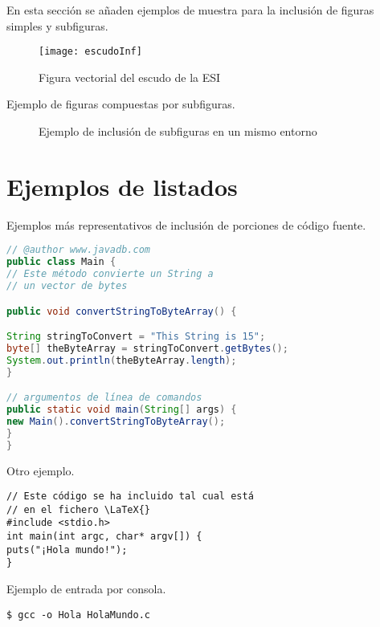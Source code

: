En esta sección se añaden ejemplos de muestra para la inclusión de figuras simples y subfiguras.

\begin{figure}[htb]
	\centering
	\texttt{[image: escudoInf]}
	\caption[Ejemplo de figura]{Figura vectorial del escudo de la ESI}
	\label{fig:ejFigure}
\end{figure}


\noindent Ejemplo de figuras compuestas por subfiguras.

\begin{figure}[htb]
	\centering
	\caption[Ejemplo de subfiguras]{Ejemplo de inclusión de subfiguras en un mismo entorno}
	\label{fig:ejSubfigures}
\end{figure}


\clearpage


\section{Ejemplos de listados}
\label{sec:ejListados}

Ejemplos más representativos de inclusión de porciones de código fuente.

\begin{lstlisting}[language=Java,float=ht,caption={[Código fuente en Java]Ejemplo de código fuente en lenguaje Java},label=lst:java]
// @author www.javadb.com
public class Main {    
// Este método convierte un String a
// un vector de bytes

public void convertStringToByteArray() {

String stringToConvert = "This String is 15";      
byte[] theByteArray = stringToConvert.getBytes();        
System.out.println(theByteArray.length);        
}

// argumentos de línea de comandos 
public static void main(String[] args) {
new Main().convertStringToByteArray();
}
}
\end{lstlisting}



\noindent Otro ejemplo.

\begin{lstlisting}[style=C,float=ht,caption={Ejemplo de código C},label=lst:codC]
// Este código se ha incluido tal cual está 
// en el fichero \LaTeX{}
#include <stdio.h>
int main(int argc, char* argv[]) {
puts("¡Hola mundo!");
}
\end{lstlisting}


\noindent Ejemplo de entrada por consola.

\begin{lstlisting}[style=consola, numbers=none]
$ gcc -o Hola HolaMundo.c
\end{lstlisting}